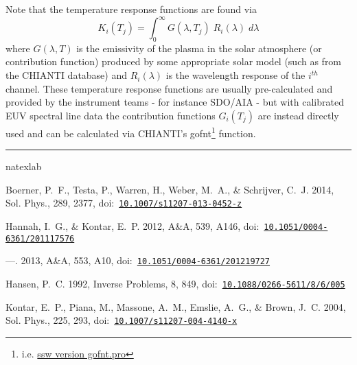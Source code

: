 \documentclass[12pt,a4paper]{article}
\newcommand{\aap}{A\&A}
\newcommand{\solphys}{Sol. Phys.}
\begin{document}
Note that the temperature response functions are found via
\begin{equation}
    K_i(T_j)=\int_0^\infty G(\lambda,T_j)\; R_i(\lambda)\; d\lambda
\end{equation}
where $G(\lambda,T)$ is the emissivity of the plasma in the solar atmosphere (or contribution function) produced by some appropriate solar model (such as from the CHIANTI database) and $R_i(\lambda)$ is the wavelength response of the $i^{th}$ channel. These temperature response functions are usually pre-calculated and provided by the instrument teams - for instance SDO/AIA \citep{2014SoPh..289.2377B} - but with calibrated EUV spectral line data the contribution functions $G_i(T_j)$ are instead directly used and can be calculated via CHIANTI's gofnt\footnote{i.e.  \href{https://hesperia.gsfc.nasa.gov/ssw/packages/chianti/idl/emiss/gofnt.pro}{ssw version gofnt.pro}} function.

\newpage
\par\noindent\rule{0.5\textwidth}{0.4pt}

%
%	
\begin{thebibliography}{}
\expandafter\ifx\csname natexlab\endcsname\relax\def\natexlab#1{#1}\fi
\providecommand{\url}[1]{\href{#1}{#1}}
\providecommand{\dodoi}[1]{doi:~\href{http://doi.org/#1}{\nolinkurl{#1}}}
\providecommand{\doeprint}[1]{\href{http://ascl.net/#1}{\nolinkurl{http://ascl.net/#1}}}
\providecommand{\doarXiv}[1]{\href{https://arxiv.org/abs/#1}{\nolinkurl{https://arxiv.org/abs/#1}}}

{Boerner}, P.~F., {Testa}, P., {Warren}, H., {Weber}, M.~A., \& {Schrijver},
  C.~J. 2014, \solphys, 289, 2377, \dodoi{10.1007/s11207-013-0452-z}

{Hannah}, I.~G., \& {Kontar}, E.~P. 2012, \aap, 539, A146,
  \dodoi{10.1051/0004-6361/201117576}

---. 2013, \aap, 553, A10, \dodoi{10.1051/0004-6361/201219727}

{Hansen}, P.~C. 1992, Inverse Problems, 8, 849,
  \dodoi{10.1088/0266-5611/8/6/005}

{Kontar}, E.~P., {Piana}, M., {Massone}, A.~M., {Emslie}, A.~G., \& {Brown},
  J.~C. 2004, \solphys, 225, 293, \dodoi{10.1007/s11207-004-4140-x}

\end{thebibliography}
\end{document}
